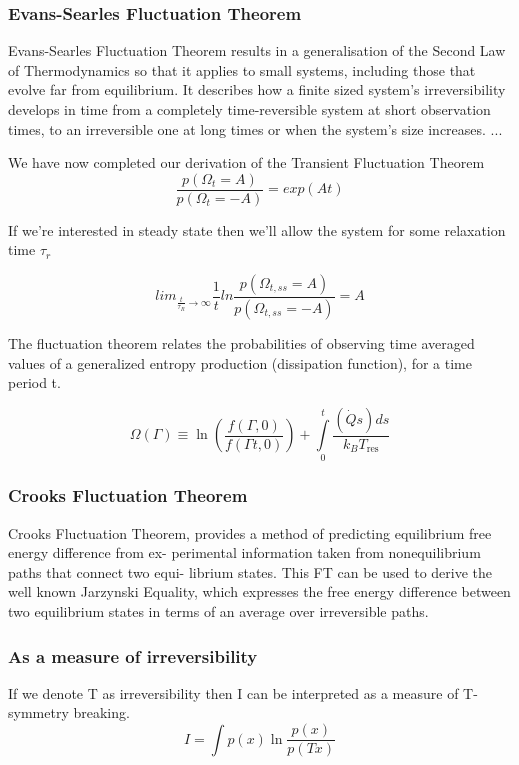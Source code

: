 \documentclass[a4paper,12pt,nofootinbib]{article}
\begin{document}
\subsubsection{Evans-Searles Fluctuation Theorem}
Evans-Searles Fluctuation Theorem results in a generalisation of the Second Law of Thermodynamics so that it applies to small systems, including those that evolve far from equilibrium.
It describes how a finite sized system's irreversibility develops in time from a completely time-reversible system at short observation times, to an irreversible one at long times or when the system's size increases. 
...

We have now completed our derivation of the Transient Fluctuation Theorem
\begin{displaymath}
  \frac{p(\Omega_t=A)}{p(\Omega_t=-A)}=exp(A t)
\end{displaymath}


If we're interested in steady state then we'll allow the system for some relaxation time $\tau_r$

\begin{displaymath}
  lim_{\frac{t}{\tau_R}\rightarrow \infty} \frac{1}{t} ln{\frac{p(\Omega_{t,ss}=A)}{p(\Omega_{t,ss}=-A)}} =A
\end{displaymath}


The fluctuation theorem relates the probabilities of observing time averaged values of a generalized entropy production (dissipation function), for a time period t.

\begin{displaymath}
  \Omega(\Gamma) \equiv \ln \left(\frac{f(\Gamma ,0)}{f(\Gamma  t,0)}\right)+\underset{0}{\overset{t}{\int }}\frac{\left(\dot{Q} s\right) ds}{k_B T_{\text{res}}}
\end{displaymath}

\subsubsection{Crooks Fluctuation Theorem}

Crooks Fluctuation Theorem, provides a method of predicting equilibrium free energy difference from ex- perimental information taken from nonequilibrium paths that connect two equi- librium states. This FT can be used to derive the well known Jarzynski Equality, which expresses the free energy difference between two equilibrium states in terms of an average over irreversible paths.

\subsubsection{As a measure of irreversibility}
If we denote T as irreversibility then I can be interpreted as a measure of T-symmetry breaking.
\begin{displaymath}
  I =\int p(x) \ln{\frac{p( x)}{p(T x)}}
\end{displaymath}
\end{document}
